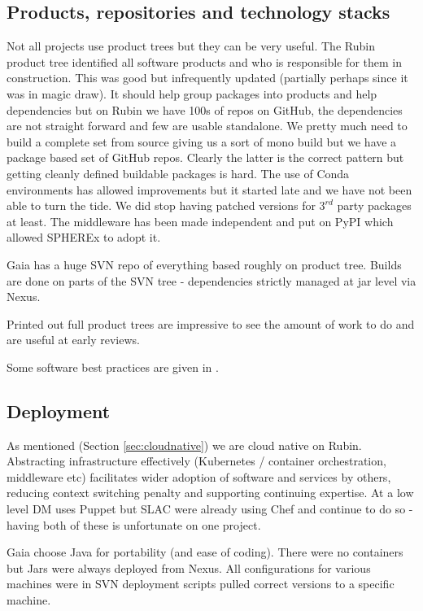 \documentclass[11pt,twoside]{article}
\begin{document}
\subsection{Products, repositories and technology stacks}
Not all projects use product trees but they can be very useful.
The Rubin product tree identified all  software products  and who is responsible for them in construction.
This was good but infrequently updated (partially perhaps since it was in magic draw).
It should help group packages into products and help dependencies but
on Rubin we have 100s of repos on GitHub, the dependencies are not straight forward and few are usable standalone.
We pretty much need to build a complete set from source giving us a sort of
 mono build but we have a package based set of GitHub repos.
Clearly the latter is the correct pattern but getting cleanly defined buildable packages is hard.
The use of Conda environments has allowed improvements but it started late and we have not been able to turn the tide.
We did stop having patched versions for $3^{rd}$ party packages at least.
The middleware has  been made independent and put on PyPI which allowed SPHEREx to adopt it.

Gaia has a huge SVN repo of everything based roughly on product tree.  Builds are done on parts of the SVN tree - dependencies strictly managed at jar level via Nexus.

Printed out full product trees are impressive to see the amount of work to do and are useful at early reviews.

\noindent Some software best practices are given in \citet{2018SPIE10707E..09J}.

\subsection{Deployment}
As mentioned (Section \ref{sec:cloudnative}) we are cloud native on Rubin.
Abstracting infrastructure effectively (Kubernetes / container orchestration, middleware etc) facilitates wider adoption of software and services by others, reducing context switching penalty and supporting continuing expertise.
At a low level DM uses Puppet but SLAC were already using Chef and continue to do so - having both of these is unfortunate on one project.

Gaia choose Java for portability  (and ease of coding).
There were no containers but Jars were always deployed from Nexus.
All configurations for various machines were in SVN  deployment scripts pulled correct versions to a specific machine.
\end{document}
